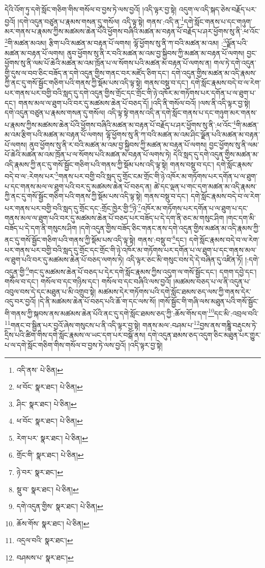 དེའི་འོག་ཏུ་དགེ་སློང་གཅིག་གིས་གསོལ་བ་བྱས་ཏེ་ལས་བྱའོ། །འདི་ལྟར་བྱ་སྟེ། འདུག་ལ་འདི་སྐད་ཅེས་བརྗོད་པར་བྱའོ། །དགེ་འདུན་བཙུན་པ་རྣམས་གསན་དུ་གསོལ། འདི་ལྟ་སྟེ། གནས་:འདི་ན་\footnote{འདི་ནས་  པེ་ཅིན། }དགེ་སློང་གནས་པ་དང་གཉུག་མར་གནས་པ་རྣམས་ཀྱིས་མཚམས་ཆེན་པོའི་ཕྱོགས་བཞིའི་མཚན་མ་བརྟན་པོ་བརྗོད་པ་ཤར་ཕྱོགས་སུ་ནི་:ཕ་འོང་\footnote{ཕ་བོང་  སྣར་ཐང་།  པེ་ཅིན། }གི་མཚན་མའམ། རྩིག་པའི་མཚན་མ་བརྟན་པོ་ལགས། ལྷོ་ཕྱོགས་སུ་ནི་ཀ་བའི་མཚན་མ་འམ། :\footnote{ཤིང་  སྣར་ཐང་།  པེ་ཅིན། }ལྗོན་པའི་མཚན་མ་བརྟན་པོ་ལགས། ནུབ་ཕྱོགས་སུ་ནི་ར་བའི་མཚན་མ་འམ་བྱ་སྐྱིབས་ཀྱི་མཚན་མ་བརྟན་པོ་ལགས། བྱང་ཕྱོགས་སུ་ནི་ལམ་པོ་ཆེའི་མཚན་མ་འམ་ཁྲོན་པ་ལ་སོགས་པའི་མཚན་མ་བརྟན་པོ་ལགས་ན། གལ་ཏེ་དགེ་འདུན་གྱི་དུས་ལ་བབ་ཅིང་བཟོད་ན་དགེ་འདུན་གྱིས་གནང་བར་མཛོད་ཅིག་དང་། དགེ་འདུན་གྱིས་མཚན་མ་འདི་རྣམས་ཀྱི་ནང་དུ་གསོ་སྦྱོང་གཅིག་པའི་གནས་ཀྱི་སྡོམ་པས་འདི་ལྟ་སྟེ། གནས་བསྡུ་བ་དང་། དགེ་སློང་རྣམས་བདེ་བ་ལ་རེག་པར་གནས་པར་བགྱི་བའི་སླད་དུ་དགེ་འདུན་གྱིས་གྲོང་དང་གྲོང་གི་ཉེ་འཁོར་མ་གཏོགས་པར་དགོན་པ་ལ་ཐུག་པ་དང་། གནས་མལ་ལ་ཐུག་པའི་བར་དུ་མཚམས་ཆེན་པོ་བཅད་དོ། །འདི་ནི་གསོལ་བའོ། །ལས་ནི་འདི་ལྟར་བྱ་སྟེ། དགེ་འདུན་བཙུན་པ་རྣམས་གསན་དུ་གསོལ། འདི་ལྟ་སྟེ་གནས་འདི་ན་དགེ་སློང་གནས་པ་དང་གཉུག་མར་གནས་པ་རྣམས་ཀྱིས་མཚམས་ཆེན་པོའི་ཕྱོགས་བཞིའི་མཚན་མ་བརྟན་པོ་བརྗོད་པ་ཤར་ཕྱོགས་སུ་ནི་:ཕ་འོང་\footnote{ཕ་བོང་  སྣར་ཐང་།  པེ་ཅིན། }གི་མཚན་མ་འམ་རྩིག་པའི་མཚན་མ་བརྟན་པོ་ལགས། ལྷོ་ཕྱོགས་སུ་ནི་ཀ་བའི་མཚན་མ་འམ་ཤིང་ལྗོན་པའི་མཚན་མ་བརྟན་པོ་ལགས། ནུབ་ཕྱོགས་སུ་ནི་ར་བའི་མཚན་མ་འམ་བྱ་སྐྱིབས་ཀྱི་མཚན་མ་བརྟན་པོ་ལགས། བྱང་ཕྱོགས་སུ་ནི་ལམ་པོ་ཆེའི་མཚན་མ་འམ་ཁྲོན་པ་ལ་སོགས་པའི་མཚན་མ་བརྟན་པོ་ལགས་ཏེ། དེའི་སླད་དུ་དགེ་འདུན་གྱིས་མཚན་མ་འདི་རྣམས་ཀྱི་ནང་དུ་གསོ་སྦྱོང་གཅིག་པའི་གནས་ཀྱི་སྡོམ་པས་འདི་ལྟ་སྟེ། གནས་བསྡུ་བ་དང་། དགེ་སློང་རྣམས་བདེ་བ་ལ་:རེགས་པར་\footnote{རེག་པར་  སྣར་ཐང་།  པེ་ཅིན། }གནས་པར་བགྱི་བའི་སླད་དུ་གྲོང་ངམ་གྲོང་གི་ཉེ་འཁོར་མ་གཏོགས་པར་དགོན་པ་ལ་ཐུག་པ་དང་གནས་མལ་ལ་ཐུག་པའི་བར་དུ་མཚམས་ཆེན་པོ་བཅད་ན། ཚེ་དང་ལྡན་པ་གང་དག་མཚན་མ་འདི་རྣམས་ཀྱི་ནང་དུ་གསོ་སྦྱོང་གཅིག་པའི་གནས་ཀྱི་སྡོམ་པས་འདི་ལྟ་སྟེ། གནས་བསྡུ་བ་དང་། དགེ་སློང་རྣམས་བདེ་བ་ལ་རེག་པར་གནས་པར་བགྱི་བའི་སླད་དུ་གྲོང་དང་:གྲོང་ཁྱེར་གྱི་\footnote{གྲོང་གི་  སྣར་ཐང་།  པེ་ཅིན། }ཉེ་\footnote{ཉེ་བར་  སྣར་ཐང་། }འཁོར་མ་གཏོགས་པར་དགོན་པ་ལ་ཐུག་པ་དང་གནས་མལ་ལ་ཐུག་པའི་བར་དུ་མཚམས་ཆེན་པོ་བཅད་པར་བཟོད་པ་དེ་དག་ནི་ཅང་མ་གསུང་ཤིག །གང་དག་མི་བཟོད་པ་དེ་དག་ནི་གསུངས་ཤིག །དགེ་འདུན་གྱིས་བཟོད་ཅིང་གནང་ནས་དགེ་འདུན་གྱིས་མཚན་མ་འདི་རྣམས་ཀྱི་ནང་དུ་གསོ་སྦྱོང་གཅིག་པའི་གནས་ཀྱི་སྡོམ་པས་འདི་ལྟ་སྟེ། གནས་:བསྡུ་བ་\footnote{སྡུ་བ་  སྣར་ཐང་།  པེ་ཅིན། }དང་། དགེ་སློང་རྣམས་བདེ་བ་ལ་རེག་པར་གནས་པར་བགྱི་བའི་སླད་དུ་གྲོང་དང་གྲོང་གི་ཉེ་འཁོར་མ་གཏོགས་པར་དགོན་པ་ལ་ཐུག་པ་དང་གནས་མལ་ལ་ཐུག་པའི་བར་དུ་མཚམས་ཆེན་པོ་བཅད་ལགས་ཏེ། འདི་ལྟར་ཅང་མི་གསུང་བས་དེ་དེ་བཞིན་དུ་འཛིན་ཏོ། །:དགེ་འདུན་གྱི་\footnote{དགེ་འདུན་གྱིས་  སྣར་ཐང་།  པེ་ཅིན། }གང་དུ་མཚམས་ཆེན་པོ་བཅད་པ་དེར་དགེ་སློང་རྣམས་ཀྱིས་འདུག་ལ་གསོ་སྦྱོང་དང་། དགག་དབྱེ་དང་། གསོལ་བ་དང་། གསོལ་བ་དང་གཉིས་དང་། གསོལ་བ་དང་བཞིའི་ལས་བྱའོ། །མཚམས་བཅད་པ་ལ་ནི་འདུན་པ་འབུལ་བས་དེ་དང་མཐུན་པ་མི་འགྲུབ་སྟེ། མཚམས་དེར་གཏོགས་པའི་དགེ་སློང་ཐམས་ཅད་ལས་ཀྱི་གནས་དེར་འདུ་བར་བྱའོ། །དེ་ནི་མཚམས་ཆེན་པོ་བཅད་པའི་ཆོ་ག་དང་ལས་སོ། །གསོ་སྦྱོང་གི་གཞི་ལས་མཐུན་པའི་གསོ་སྦྱོང་གི་གནས་ཀྱི་སྐབས་ནས་མཚམས་ཆེན་པོའི་ནང་དུ་དགེ་སློང་ཐམས་ཅད་ཀྱི་:ཆོས་གོས་དག་\footnote{ཆོས་གོས་  སྣར་ཐང་།  པེ་ཅིན། }དང་མི་:འབྲལ་བའི་\footnote{འདྲལ་བའི་  སྣར་ཐང་། }གནང་བ་སྦྱིན་པར་བྱའོ་ཞེས་གསུངས་པ་ནི་འདི་ལྟར་བྱ་སྟེ། གནས་མལ་:བཤམ་པ་\footnote{བཤམས་པ་  སྣར་ཐང་། }བྱས་ནས་གཎྜཱི་བརྡུངས་ཏེ་དྲིས་པའི་ཚིག་གིས་དགེ་སློང་རྣམས་ལ་ཡང་དག་པར་བསྒོ་ནས། དགེ་འདུན་ཐམས་ཅད་འདུག་ཅིང་མཐུན་པར་གྱུར་པ་ལ་དགེ་སློང་གཅིག་གིས་གསོལ་བ་བྱས་ཏེ་ལས་བྱའོ། །འདི་ལྟར་བྱ་སྟེ། 